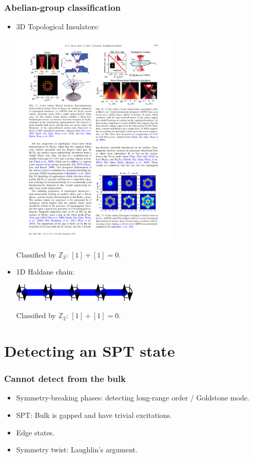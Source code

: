 \documentclass[xcolor=table, aspectratio=43,ignorenonframetext]{beamer}
\begin{document}
\begin{frame}
	\frametitle{Abelian-group classification}
	\begin{itemize}
		\item 3D Topological Insulators:
		\begin{center}
			\includegraphics[width=8cm]{../spspt/ti_surface}
		\end{center}
		Classified by $\mathbb Z_2$: $[1]+[1] = 0$.
		\item 1D Haldane chain:
		\begin{center}
			\includegraphics[width=6cm]{../dimer/weak3d_aklt_blue}
		\end{center}
		Classified by $\mathbb Z_2$: $[1]+[1] = 0$.
	\end{itemize}
\end{frame}


\section{Detecting an SPT state}

\begin{frame}
	\frametitle{Cannot detect from the bulk}
	\begin{itemize}
		\item Symmetry-breaking phases: detecting long-range order / Goldstone mode.
		\item SPT: Bulk is gapped and have trivial excitations.
		\item Edge states.
		\item Symmetry twist: Laughlin's argument.
	\end{itemize}
\end{frame}
\end{document}
